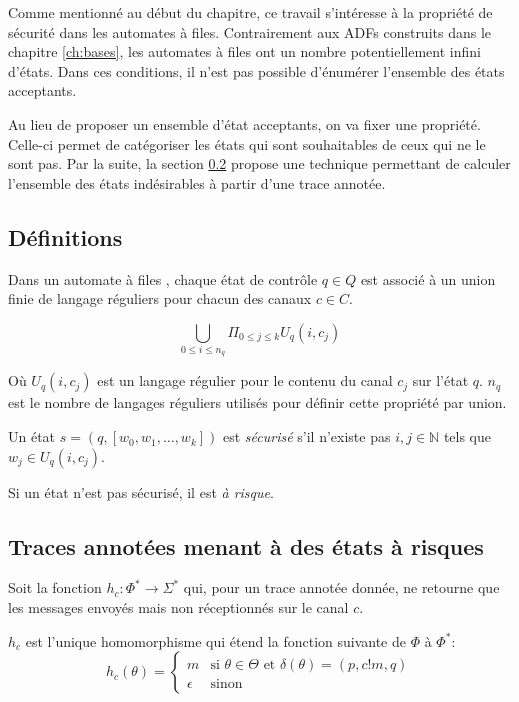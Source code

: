 Comme mentionné au début du chapitre, ce travail s'intéresse à la propriété de sécurité dans les automates à files. Contrairement aux ADFs construits dans le chapitre \ref{ch:bases}, les automates à files ont un nombre potentiellement infini d'états. Dans ces conditions, il n'est pas possible d'énumérer l'ensemble des états acceptants.

Au lieu de proposer un ensemble d'état acceptants, on va fixer une propriété. Celle-ci permet de catégoriser les états qui sont souhaitables de ceux qui ne le sont pas. Par la suite, la section \ref{ss:tracesafety} propose une technique permettant de calculer l'ensemble des états indésirables à partir d'une trace annotée.


\subsection{Définitions}
Dans un automate à files \fifo, chaque état de contrôle $q\in Q$ est associé à un union finie de langage réguliers pour chacun des canaux $c\in C$.


$$\bigcup_{0 \leq i \leq n_q}\Pi_{0 \leq j \leq k}U_q(i,c_j)$$

Où $U_q(i,c_j)$ est un langage régulier pour le contenu du canal $c_j$ sur l'état $q$. $n_q$ est le nombre de langages réguliers utilisés pour définir cette propriété par union.

Un état $s=(q,[w_0,w_1,\dots,w_k])$ est \emph{sécurisé} s'il n'existe pas $i,j \in \mathbb{N}$ tels que $w_j \in U_q(i,c_j)$.

Si un état n'est pas sécurisé, il est \emph{à risque}.



\subsection{Traces annotées menant à des états à risques}\label{ss:tracesafety}

Soit la fonction $h_c:\Phi^*\rightarrow\Sigma^*$ qui, pour un trace annotée donnée, ne retourne que les messages envoyés mais non réceptionnés sur le canal $c$.

$h_c$ est l'unique homomorphisme qui étend la fonction suivante de $\Phi$ à $\Phi^*$:
$$ h_c(\theta) = \left\{ \begin{array}{ll}
      m & \text{si } \theta\in\Theta\text{ et }\delta(\theta)=(p,c!m,q)\\
      \epsilon & \text{sinon}\end{array} \right. $$



